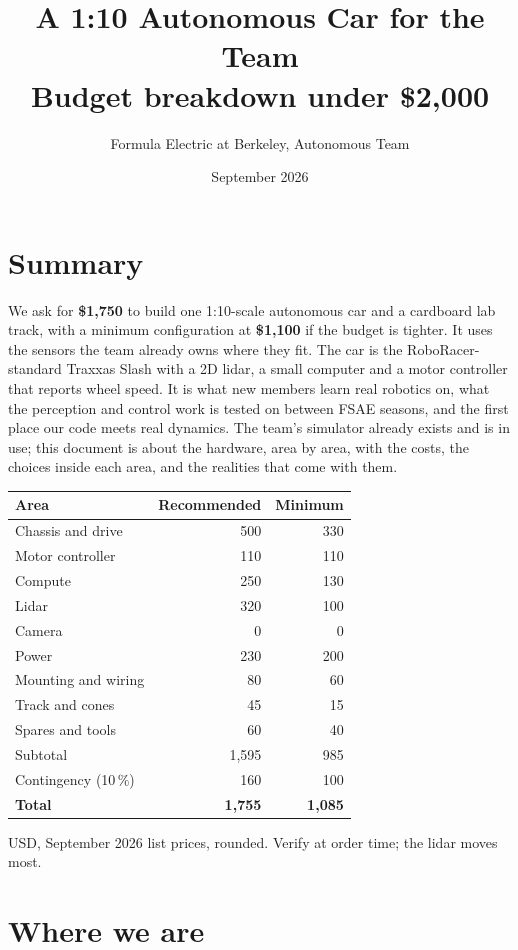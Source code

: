 \documentclass[11pt,a4paper]{article}
\title{\color{febblue}\LARGE A 1:10 Autonomous Car for the Team\\[4pt]\large Budget breakdown under \$2{,}000}
\author{Formula Electric at Berkeley, Autonomous Team}
\date{September 2026}
\begin{document}
\maketitle

\section*{Summary}

We ask for \textbf{\$1{,}750} to build one 1:10-scale autonomous car and a cardboard lab
track, with a minimum configuration at \textbf{\$1{,}100} if the budget is tighter. It uses
the sensors the team already owns where they fit. The car is the
RoboRacer-standard Traxxas Slash with a 2D lidar, a small computer and a motor controller
that reports wheel speed. It is what new members learn real robotics on, what the perception
and control work is tested on between FSAE seasons, and the first place our code meets real
dynamics. The team's simulator already exists and is in use; this document is about the
hardware, area by area, with the costs, the choices inside each area, and the realities that
come with them.

\begin{tabularx}{\linewidth}{Xrr}
\toprule
Area & Recommended & Minimum \\
\midrule
Chassis and drive & 500 & 330 \\
Motor controller & 110 & 110 \\
Compute & 250 & 130 \\
Lidar & 320 & 100 \\
Camera & 0 & 0 \\
Power & 230 & 200 \\
Mounting and wiring & 80 & 60 \\
Track and cones & 45 & 15 \\
Spares and tools & 60 & 40 \\
\midrule
Subtotal & 1{,}595 & 985 \\
Contingency (10\,\%) & 160 & 100 \\
\textbf{Total} & \textbf{1{,}755} & \textbf{1{,}085} \\
\bottomrule
\end{tabularx}

\smallskip
\noindent USD, September 2026 list prices, rounded. Verify at order time; the lidar moves most.

\section{Where we are}
\end{document}

